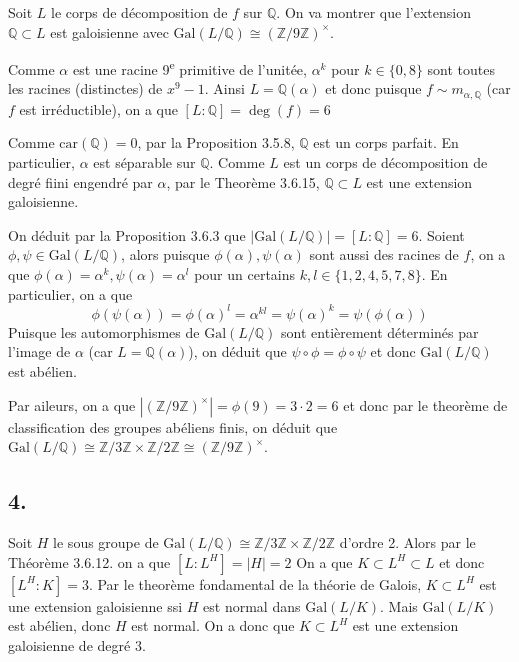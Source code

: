 \documentclass{article}
\newcommand{\Q}{\mathbb{Q}}
\newcommand{\Z}{\mathbb{Z}}
\newcommand{\Gal}{\mathrm{Gal}}
\newcommand{\car}{\mathrm{car}}
\newcommand{\ts}{\textsuperscript}
\begin{document}
Soit $L$ le corps de décomposition de $f$ sur $\Q$. On va montrer que
l'extension $\Q \subset L$ est galoisienne avec
$\Gal(L/\Q) \cong (\Z/9\Z)^\times$.

Comme $\alpha$ est une racine 9\ts{e} primitive de l'unitée, 
$\alpha^k$ pour $k \in \{0, 8\}$ sont toutes les racines (distinctes) de
$x^9 - 1$. Ainsi $L = \Q(\alpha)$ et donc puisque $f \sim m_{\alpha, \Q}$
(car $f$ est irréductible), on a que $[L : \Q] = \deg(f) = 6$

Comme $\car(\Q) = 0$, par la Proposition 3.5.8, $\Q$ est un corps parfait.
En particulier, $\alpha$ est séparable sur $\Q$.
Comme $L$ est un corps de décomposition de degré fiini engendré par $\alpha$,
par le Theorème 3.6.15, $\Q \subset L$ est une extension galoisienne.

On déduit par la Proposition 3.6.3 que $|\Gal(L/\Q)| = [L : \Q] = 6$.
Soient $\phi, \psi \in \Gal(L/\Q)$, alors puisque $\phi(\alpha), \psi(\alpha)$
sont aussi des racines de $f$, on a que
$\phi(\alpha) = \alpha^k, \psi(\alpha) = \alpha^l$ pour un certains
$k, l \in \{1, 2, 4, 5, 7, 8\}$. En particulier, on a que
\begin{equation*}
	\phi(\psi(\alpha)) = \phi(\alpha)^l = \alpha^{kl} = \psi(\alpha)^k =
	\psi(\phi(\alpha))
\end{equation*}
Puisque les automorphismes de $\Gal(L/\Q)$ sont entièrement déterminés par
l'image de $\alpha$ (car $L = \Q(\alpha)$), on déduit que
$\psi\circ\phi = \phi\circ\psi$ et donc $\Gal(L/\Q)$ est abélien.

Par aileurs, on a que $|(\Z/9\Z)^\times| = \phi(9) = 3\cdot 2 = 6$ et donc
par le theorème de classification des groupes abéliens finis, on déduit que
$\Gal(L/\Q) \cong \Z/3\Z \times \Z/2\Z \cong (\Z/9\Z)^\times$.

\subsection*{4.}

Soit $H$ le sous groupe de $\Gal(L/\Q) \cong \Z/3\Z \times \Z/2\Z$ d'ordre 2.
Alors par le Théorème 3.6.12. on a que $[L : L^H] = |H| = 2$
On a que $K \subset L^H \subset L$ et donc $[L^H : K] = 3$.
Par le theorème fondamental de la théorie de Galois, $K \subset L^H$ est une
extension galoisienne ssi $H$ est normal dans $\Gal(L/K)$.
Mais $\Gal(L/K)$ est abélien, donc $H$ est normal. On a donc que
$K \subset L^H$ est une extension galoisienne de degré $3$.
\end{document}
